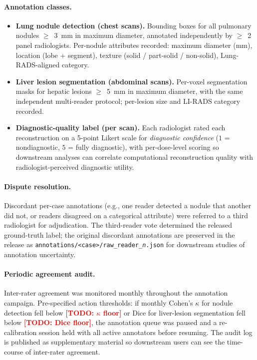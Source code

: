 \documentclass[twoside,11pt]{article}
\newcommand{\todo}[1]{\textcolor{red}{\textbf{[TODO: #1]}}}
\begin{document}
\paragraph{Annotation classes.}

\begin{itemize}
    \item \textbf{Lung nodule detection (chest scans).} Bounding boxes for all pulmonary nodules $\geq$~3~mm in maximum diameter, annotated independently by $\geq$~2 panel radiologists. Per-nodule attributes recorded: maximum diameter (mm), location (lobe + segment), texture (solid / part-solid / non-solid), Lung-RADS-aligned category.
    \item \textbf{Liver lesion segmentation (abdominal scans).} Per-voxel segmentation masks for hepatic lesions $\geq$~5~mm in maximum diameter, with the same independent multi-reader protocol; per-lesion size and LI-RADS category recorded.
    \item \textbf{Diagnostic-quality label (per scan).} Each radiologist rated each reconstruction on a 5-point Likert scale for \textit{diagnostic confidence} ($1$ = nondiagnostic, $5$ = fully diagnostic), with per-dose-level scoring so downstream analyses can correlate computational reconstruction quality with radiologist-perceived diagnostic utility.
\end{itemize}

\paragraph{Dispute resolution.} Discordant per-case annotations (e.g., one reader detected a nodule that another did not, or readers disagreed on a categorical attribute) were referred to a third radiologist for adjudication. The third-reader vote determined the released ground-truth label; the original discordant annotations are preserved in the release as \texttt{annotations/<case>/raw\_reader\_\textit{n}.json} for downstream studies of annotation uncertainty.

\paragraph{Periodic agreement audit.} Inter-rater agreement was monitored monthly throughout the annotation campaign. Pre-specified action thresholds: if monthly Cohen's $\kappa$ for nodule detection fell below \todo{$\kappa$ floor} or Dice for liver-lesion segmentation fell below \todo{Dice floor}, the annotation queue was paused and a re-calibration session held with all active annotators before resuming. The audit log is published as supplementary material so downstream users can see the time-course of inter-rater agreement.
\end{document}
